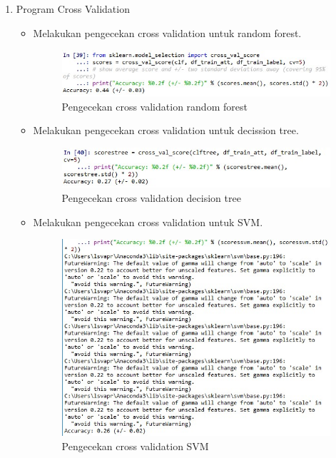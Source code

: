 \begin{enumerate}
\item Program Cross Validation
	\begin{itemize}
		\item Melakukan pengecekan cross validation untuk random forest.
			\begin{figure}[ht]
			\centering
			\includegraphics[scale=0.5]{figures/AFS/fajar1.jpg}
			\caption{Pengecekan cross validation random forest}
			\label{contoh}
			\end{figure}
		\item Melakukan pengecekan cross validation untuk decission tree.
			\begin{figure}[ht]
			\centering
			\includegraphics[scale=0.5]{figures/AFS/fajar2.jpg}
			\caption{Pengecekan cross validation decision tree}
			\label{contoh}
			\end{figure}
		\item Melakukan pengecekan cross validation untuk SVM.
			\begin{figure}[ht]
			\centering
			\includegraphics[scale=0.5]{figures/AFS/fajar3.jpg}
			\caption{Pengecekan cross validation SVM}
			\label{contoh}
			\end{figure}

\end{itemize}
\end{enumerate}
